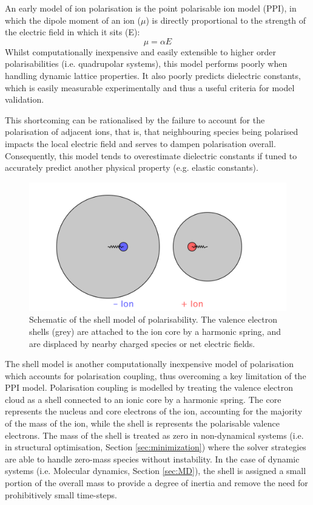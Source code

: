 An early model of ion polarisation is the point polarisable ion model (PPI), in which the dipole moment of an ion ($\mu$) is directly proportional to the strength of the electric field in which it sits (E):
\begin{equation}
\mu = \alpha E
\end{equation}
Whilst computationally inexpensive and easily extensible to higher order polarisabilities (i.e. quadrupolar systems), this model performs poorly when handling dynamic lattice properties.
It also poorly predicts dielectric constants, which is easily measurable experimentally and thus a useful criteria for model validation.

This shortcoming can be rationalised by the failure to account for the polarisation of adjacent ions, that is, that neighbouring species being polarised impacts the local electric field and serves to dampen polarisation overall.
Consequently, this model tends to overestimate dielectric constants if tuned to accurately predict another physical property (e.g. elastic constants).


\begin{figure}[ht]
  \centering
  \includegraphics[width=\linewidth]{figures/coreshell/coreshell}
  \caption[Shell model schematic]{Schematic of the shell model of polarisability. The valence electron shells (grey) are attached to the ion core by a harmonic spring, and are displaced by nearby charged species or net electric fields.}
\end{figure}
The shell model\cite{Dick1958} is another computationally inexpensive model of polarisation which accounts for polarisation coupling, thus overcoming a key limitation of the PPI model.
Polarisation coupling is modelled by treating the valence electron cloud as a shell connected to an ionic core by a harmonic spring.
The core represents the nucleus and core electrons of the ion, accounting for the majority of the mass of the ion, while the shell is represents the polarisable valence electrons.
The mass of the shell is treated as zero in non-dynamical systems (i.e. in structural optimisation, Section \ref{sec:minimization}) where the solver strategies are able to handle zero-mass species without instability.
In the case of dynamic systems (i.e. Molecular dynamics, Section \ref{sec:MD}), the shell is assigned a small portion of the overall mass to provide a degree of inertia and remove the need for prohibitively small time-steps.

